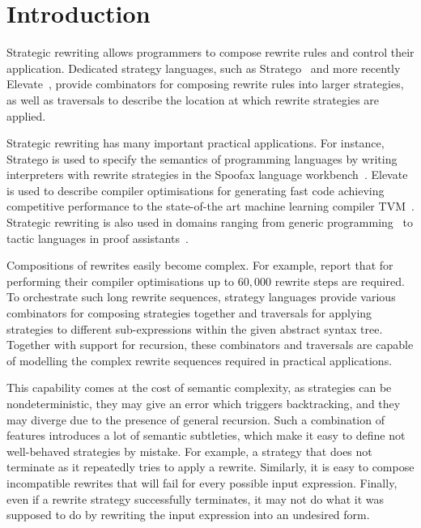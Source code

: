 \section{Introduction}
\label{chap4:introduction}
Strategic rewriting allows programmers to compose rewrite rules and control their application.
Dedicated strategy languages, such as Stratego~\citep{DBLP:conf/icfp/VisserBT98,10.1007/3-540-45127-7_27} and more recently Elevate~\citep{DBLP:journals/cacm/HagedornLKQGS23,DBLP:journals/pacmpl/HagedornLKQGS20}, provide combinators for composing rewrite rules into larger strategies, as well as traversals to describe the location at which rewrite strategies are applied.

Strategic rewriting has many important practical applications. For instance, Stratego is used to specify the semantics of programming languages by writing interpreters with rewrite strategies in the Spoofax language workbench~\citep{DBLP:journals/software/WachsmuthKV14}.
Elevate is used to describe compiler optimisations for generating fast code achieving competitive performance to the state-of-the art machine learning compiler TVM~\citep{DBLP:journals/pacmpl/HagedornLKQGS20}. Strategic rewriting is also used in domains ranging from generic programming~\citep{DBLP:conf/rule/LammelV02} to tactic languages in proof assistants~\citep{sozeau2014proof}.

Compositions of rewrites easily become complex.
For example, \citet{DBLP:journals/pacmpl/HagedornLKQGS20} report that for performing their compiler optimisations up to $60,000$ rewrite steps are required. To orchestrate such long rewrite sequences, strategy languages provide various combinators for composing strategies together and traversals for applying strategies to different sub-expressions within the given abstract syntax tree.
Together with support for recursion, these combinators and traversals are capable of modelling the complex rewrite sequences required in practical applications.

This capability comes at the cost of semantic complexity, as strategies can be nondeterministic, they may give an error which triggers backtracking, and they may diverge due to the presence of general recursion. Such a combination of features introduces a lot of semantic subtleties, which make it
easy to define not well-behaved strategies by mistake. For example, a strategy that does not terminate as it repeatedly tries to apply a rewrite.
Similarly, it is easy to compose incompatible rewrites
that will fail for every possible input expression.
Finally, even if a rewrite strategy successfully terminates, it may not do what it was supposed to do by rewriting the input expression into an undesired form.

